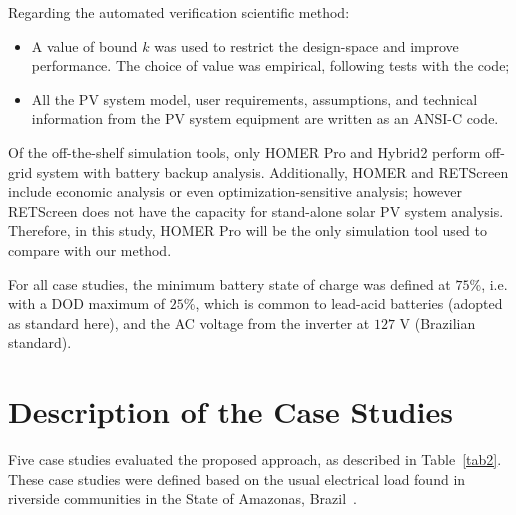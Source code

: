 Regarding the automated verification scientific method:

\begin{itemize}
\item A value of bound $k$ was used to restrict the design-space and improve performance. The choice of value was empirical, following tests with the code;
\item All the PV system model, user requirements, assumptions, and technical information from the PV system equipment are written as an ANSI-C code.
\end{itemize}

Of the off-the-shelf simulation tools, only HOMER Pro and Hybrid2 perform off-grid system with battery backup analysis. Additionally, HOMER and RETScreen include economic analysis or even optimization-sensitive analysis; however RETScreen does not have the capacity for stand-alone solar PV system analysis. Therefore, in this study, HOMER Pro will be the only simulation tool used to compare with our method.  

For all case studies, the minimum battery state of charge was defined at $75$\%, i.e. with a DOD maximum of $25$\%, which is common to lead-acid batteries (adopted as standard here), and the AC voltage from the inverter at $127$ V (Brazilian standard).


\section{Description of the Case Studies}

Five case studies evaluated the proposed approach, as described in Table~\ref{tab2}. %
These case studies were defined based on the usual electrical load found in riverside communities in the State of Amazonas,  Brazil~\cite{TrindadeCordeiro19, Agrener2013}.

